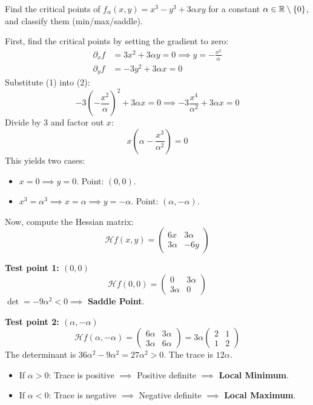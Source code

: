 \hrulefill

\begin{exercise*}
Find the critical points of $f_\alpha(x,y) = x^3 - y^3 + 3\alpha xy$ for a constant $\alpha \in \mathbb{R} \setminus \left\{ 0 \right\}$, and classify them (min/max/saddle).
\end{exercise*}

\begin{solution}
First, find the critical points by setting the gradient to zero:
\begin{equation}
\begin{aligned}
    \partial_x f &= 3x^2 + 3\alpha y = 0 \implies y = -\frac{x^2}{\alpha} \\
    \partial_y f &= -3y^2 + 3\alpha x = 0
\end{aligned}
\end{equation}
Substitute (1) into (2):
\[ -3\left(-\frac{x^2}{\alpha}\right)^2 + 3\alpha x = 0 \implies -3\frac{x^4}{\alpha^2} + 3\alpha x = 0 \]
Divide by 3 and factor out $x$:
\[ x \left( \alpha - \frac{x^3}{\alpha^2} \right) = 0 \]
This yields two cases:
\begin{itemize}
    \item $x = 0 \implies y = 0$. Point: \textbf{$(0,0)$}.
    \item $x^3 = \alpha^3 \implies x = \alpha \implies y = -\alpha$. Point: \textbf{$(\alpha, -\alpha)$}.
\end{itemize}

Now, compute the Hessian matrix:
\[ \mathscr{H}f(x,y) = \begin{pmatrix} 6x & 3\alpha \\ 3\alpha & -6y \end{pmatrix} \]

\textbf{Test point 1: $(0,0)$}
\[ \mathscr{H}f(0,0) = \begin{pmatrix} 0 & 3\alpha \\ 3\alpha & 0 \end{pmatrix} \]
$\det = -9\alpha^2 < 0 \implies$ \textcolor{eSaddleBrown}{\textbf{Saddle Point}}.

\textbf{Test point 2: $(\alpha, -\alpha)$}
\[ \mathscr{H}f(\alpha, -\alpha) = \begin{pmatrix} 6\alpha & 3\alpha \\ 3\alpha & 6\alpha \end{pmatrix} = 3\alpha \begin{pmatrix} 2 & 1 \\ 1 & 2 \end{pmatrix} \]
The determinant is $36\alpha^2 - 9\alpha^2 = 27\alpha^2 > 0$. The trace is $12\alpha$.
\begin{itemize}
    \item If $\alpha > 0$: Trace is positive $\implies$ Positive definite $\implies$ \textcolor{eDarkGreen}{\textbf{Local Minimum}}.
    \item If $\alpha < 0$: Trace is negative $\implies$ Negative definite $\implies$ \textcolor{eDarkRed}{\textbf{Local Maximum}}.
\end{itemize}
\end{solution}